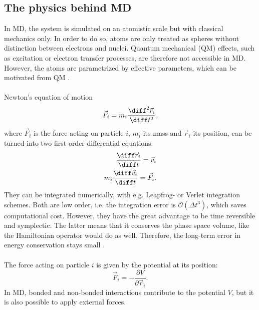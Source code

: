\subsection{The physics behind MD}
In MD, the system is simulated on an atomistic scale but with classical mechanics only. In order to do so, atoms are only treated as spheres without distinction between electrons and nuclei. Quantum mechanical (QM) effects, such as excitation or electron transfer processes, are therefore not accessible in MD. However, the atoms are parametrized by effective parameters, which can be motivated from QM \autocite[p. 127f]{greenBook}.\\
\\
Newton's equation of motion
\begin{equation}
\vec{F}_i = m_i\frac{\diff^2 \vec{r}_i}{\diff t^2},
\end{equation}
where $\vec{F}_i$ is the force acting on particle $i$, $m_i$ its mass and $\vec{r}_i$ its position, can be turned into two first-order differential equations:
\begin{align}
\label{eq:eq_of_mot_first_order}
\frac{\diff \vec{r}_i}{\diff t} = \vec{v}_i \\
m_i \frac{\diff \vec{v}_i}{\diff t} = \vec{F}_i .
\end{align}
They can be integrated numerically, with e.g. Leapfrog- or Verlet integration schemes. Both are low order, i.e. the integration error is $\mathcal{O}(\Delta t^3)$, which saves computational cost. However, they have the great advantage to be time reversible and symplectic. The latter means that it conserves the phase space volume, like the Hamiltonian operator would do as well. Therefore, the long-term error in energy conservation stays small \autocite[p. 72ff]{UnderstandingMD}.\\
\\
The force acting on particle $i$ is given by the potential at its position:
\begin{equation}
\vec{F}_i = - \frac{\partial V}{\partial \vec{r}_i} .
\end{equation}
In MD, bonded and non-bonded interactions contribute to the potential $V$, but it is also possible to apply external forces.
